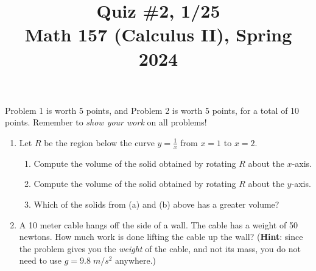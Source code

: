 \documentclass[11pt]{article}
\title{Quiz \#2, 1/25 \\ Math 157 (Calculus II), Spring 2024}
\date{}
\begin{document}
\maketitle

\thispagestyle{empty}

\vspace{-2cm}

Problem 1 is worth 5 points, and Problem 2 is worth 5 points, for a total of 10 points. Remember to \emph{show your work} on all problems!

\begin{enumerate}
\item Let $R$ be the region below the curve $y=\frac{1}{x}$ from $x=1$ to $x=2$.
\begin{enumerate}
\item Compute the volume of the solid obtained by rotating $R$ about the $x$-axis.
\item Compute the volume of the solid obtained by rotating $R$ about the $y$-axis.
\item Which of the solids from (a) and (b) above has a greater volume?
\end{enumerate}

\vspace{8cm}

\item A 10 meter cable hangs off the side of a wall. The cable has a weight of 50 newtons. How much work is done lifting the cable up the wall? ({\bf Hint}: since the problem gives you the \emph{weight} of the cable, and not its mass, you do not need to use $g=9.8 \; m/s^2$ anywhere.)

\end{enumerate}
\end{document}
